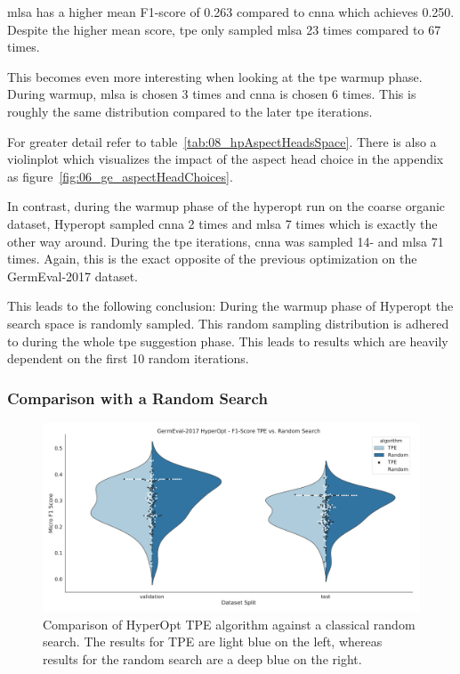 \gls{mlsa} has a higher mean F1-score of 0.263 compared to \gls{cnna} which achieves 0.250. Despite the higher mean score, \gls{tpe} only sampled \gls{mlsa} 23 times compared to 67 times.

This becomes even more interesting when looking at the \gls{tpe} warmup phase. During warmup, \gls{mlsa} is chosen 3 times and \gls{cnna} is chosen 6 times. This is roughly the same distribution compared to the later \gls{tpe} iterations. 

For greater detail refer to table~\ref{tab:08_hpAspectHeadsSpace}. There is also a violinplot which visualizes the impact of the aspect head choice in the appendix as figure~\ref{fig:06_ge_aspectHeadChoices}.
\medskip

In contrast, during the warmup phase of the hyperopt run on the coarse organic dataset, Hyperopt sampled \gls{cnna} 2 times and \gls{mlsa} 7 times which is exactly the other way around. During the \gls{tpe} iterations, \gls{cnna} was sampled 14- and \gls{mlsa} 71 times. Again, this is the exact opposite of the previous optimization on the GermEval-2017 dataset.
\medskip

This leads to the following conclusion: During the warmup phase of Hyperopt the search space is randomly sampled. This random sampling distribution is adhered to during the whole \gls{tpe} suggestion phase. This leads to results which are heavily dependent on the first 10 random iterations.

\subsubsection*{Comparison with a Random Search}

\begin{figure}[ht]
	\centering
	\includegraphics[width=\textwidth]{figures/06_results/06_hp_ge_vio_tpeRand}
	\caption{Comparison of HyperOpt TPE algorithm against a classical random search. The results for TPE are light blue on the left, whereas results for the random search are a deep blue on the right.}
	\label{fig:06_HpOptimTpe_Rand}
\end{figure}

